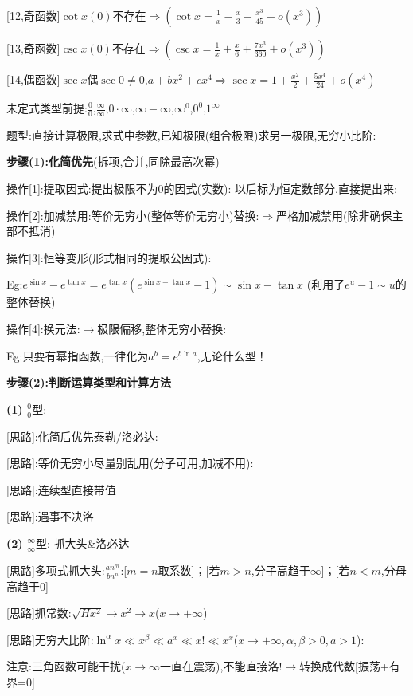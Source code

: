 \documentclass[11pt,a4paper,UTF8]{ctexart}
\begin{document}
[12,奇函数]$\cot x(0)$不存在$\Rightarrow (\cot x = \frac{1}{x} - \frac{x}{3} - \frac{x^3}{45} + o(x^3))$

[13,奇函数]$\csc x(0)$不存在$\Rightarrow (\csc x = \frac{1}{x} + \frac{x}{6} + \frac{7x^3}{360} + o(x^3))$

[14,偶函数]$\sec x$偶$\sec 0 \neq 0$,$a + bx^2 + cx^4 \Rightarrow \sec x = 1 + \frac{x^2}{2} + \frac{5x^4}{24} + o(x^4)$

\begin{thmbox}[{解法[6]: [微分]7种未定式计算}]

未定式类型前提:$\frac{0}{0}$,$\frac{\infty}{\infty}$,$0 \cdot \infty$,$\infty - \infty$,$\infty^0$,$0^0$,$1^\infty$

题型:直接计算极限,求式中参数,已知极限(组合极限)求另一极限,无穷小比阶:

\textbf{步骤(1):化简优先}(拆项,合并,同除最高次幂)

操作[1]:提取因式:提出极限不为$0$的因式(实数): 以后标为恒定数部分,直接提出来:

操作[2]:加减禁用:等价无穷小(整体等价无穷小)替换:$\Rightarrow$严格加减禁用(除非确保主部不抵消)

操作[3]:恒等变形(形式相同的提取公因式):

  Eg:$e^{\sin x} - e^{\tan x} = e^{\tan x}(e^{\sin x - \tan x} - 1) \sim \sin x - \tan x$	(利用了$e^u - 1 \sim u$的整体替换)

操作[4]:换元法:$\to$极限偏移,整体无穷小替换:

  Eg:只要有幂指函数,一律化为$a^b = e^{b \ln a}$,无论什么型！

\textbf{步骤(2):判断运算类型和计算方法}

\textbf{(1)} $\frac{0}{0}$型:

  [思路]:化简后优先泰勒/洛必达:

  [思路]:等价无穷小尽量别乱用(分子可用,加减不用):

  [思路]:连续型直接带值

  [思路]:遇事不决洛

\textbf{(2)} $\frac{\infty}{\infty}$型: 抓大头\&洛必达

  [思路]多项式抓大头:$\frac{an^m}{bn^n}$:[$m=n$取系数]；[若$m>n$,分子高趋于$\infty$]；[若$n<m$,分母高趋于$0$]

  [思路]抓常数:$\sqrt{H x^2} \to x^2 \to x$($x \to +\infty$)

  [思路]无穷大比阶:$\ln^\alpha x \ll x^\beta \ll a^x \ll x! \ll x^x$($x \to +\infty, \alpha,\beta>0, a>1$):

  注意:三角函数可能干扰($x\to \infty$一直在震荡),不能直接洛!$\to$转换成代数[振荡+有界=0]


\end{thmbox}
\end{document}
